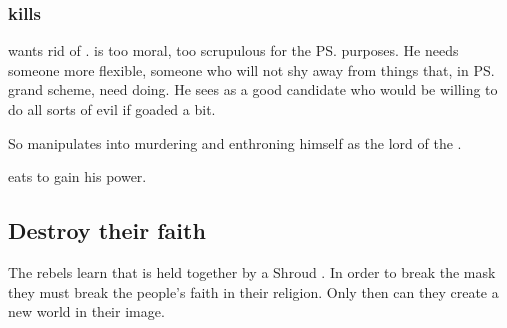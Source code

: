 \subsubsection{\Morcariel kills \Damiarch}
\Daggerrain{} wants rid of \Damiarch. 
\Damiarch{} is too moral, too scrupulous for the \ps{\banelord}{} purposes. 
He needs someone more flexible, someone who will not shy away from things that, in \ps{\Daggerrain}{} grand scheme, need doing. 
He sees \Morcariel as a good candidate who would be willing to do all sorts of evil if goaded a bit. 

So \Daggerrain{} manipulates \Morcariel into murdering \Damiarch{} and enthroning himself as the lord of the \resphain. 

\Morcariel eats \Damiarch{} to gain his power. 










\subsection{Destroy their faith}
The rebels learn that \Merkyrah{} is held together by a Shroud . 
In order to break the mask they must break the \Merkyran{} people's faith in their religion. 
Only then can they create a new world in their image. 

